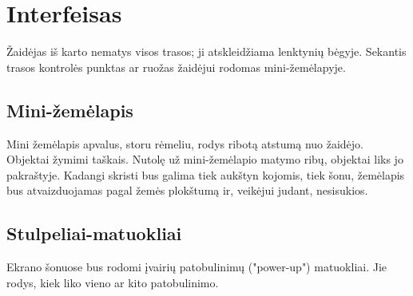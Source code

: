 \section{Interfeisas}

Žaidėjas iš karto nematys visos trasos; ji atskleidžiama lenktynių bėgyje.
Sekantis trasos kontrolės punktas ar ruožas žaidėjui rodomas mini-žemėlapyje.

\subsection{Mini-žemėlapis}

Mini žemėlapis apvalus, storu rėmeliu, rodys ribotą atstumą nuo žaidėjo.
Objektai žymimi taškais.
Nutolę už mini-žemėlapio matymo ribų, objektai liks jo pakraštyje.
Kadangi skristi bus galima tiek aukštyn kojomis, tiek šonu, žemėlapis bus atvaizduojamas pagal žemės plokštumą ir, veikėjui judant, nesisukios.

\subsection{Stulpeliai-matuokliai}

Ekrano šonuose bus rodomi įvairių patobulinimų ("power-up") matuokliai.
Jie rodys, kiek liko vieno ar kito patobulinimo.
